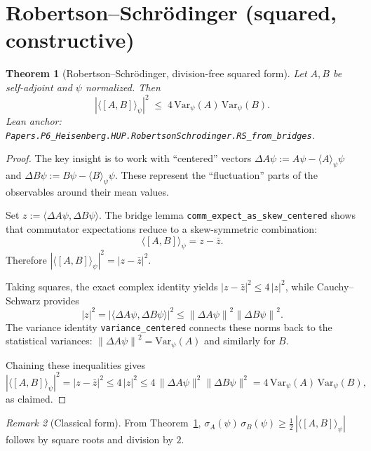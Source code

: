\documentclass[11pt]{article}
\newcommand{\lean}[1]{\texttt{#1}}
\newcommand{\leanok}{\text{\tiny [✓ Lean Verified]}}
\newcommand{\ip}[2]{\langle #1, #2 \rangle}
\newcommand{\E}[1]{\langle #1 \rangle}
\newcommand{\comm}[2]{[#1, #2]}
\newcommand{\stddev}{\sigma}
\newcommand{\absC}[1]{\left| #1 \right|}
\newcommand{\abssq}[1]{\absC{#1}^{2}}
\newcommand{\norm}[1]{\left\lVert #1 \right\rVert}
\newcommand{\Var}{\mathrm{Var}}
\theoremstyle{plain}
\newtheorem{theorem}{Theorem}[section]
\theoremstyle{definition}
\theoremstyle{remark}
\newtheorem{remark}[theorem]{Remark}
\begin{document}
\section{Robertson--Schrödinger (squared, constructive)}
\label{sec:RS}

\begin{theorem}[Robertson--Schrödinger, division-free squared form]\leanok
\label{thm:RS-squared}
Let $A,B$ be self-adjoint and $\psi$ normalized. Then
\[
  \abssq{\E{\comm{A}{B}}_\psi} \;\le\; 4\,\Var_\psi(A)\,\Var_\psi(B).
\]
\emph{Lean anchor:} \lean{Papers.P6\_Heisenberg.HUP.RobertsonSchrodinger.RS\_from\_bridges}.
\end{theorem}

\begin{proof}
The key insight is to work with ``centered'' vectors $\Delta A\psi := A\psi - \langle A \rangle_\psi \psi$ and $\Delta B\psi := B\psi - \langle B \rangle_\psi \psi$. These represent the ``fluctuation'' parts of the observables around their mean values.

Set $z := \ip{\Delta A\psi}{\Delta B\psi}$. The bridge lemma \lean{comm\_expect\_as\_skew\_centered} shows that commutator expectations reduce to a skew-symmetric combination:
\[
\E{\comm{A}{B}}_\psi = z - \bar{z}.
\]
Therefore $\abssq{\E{\comm{A}{B}}_\psi} = \abssq{z - \bar{z}}$.

Taking squares, the exact complex identity yields $\abssq{z - \bar{z}} \le 4\,\abssq{z}$, while Cauchy--Schwarz provides
\[
\abssq{z} = \abssq{\ip{\Delta A\psi}{\Delta B\psi}} \leq \norm{\Delta A\psi}^2 \norm{\Delta B\psi}^2.
\]
The variance identity \lean{variance\_centered} connects these norms back to the statistical variances: $\norm{\Delta A\psi}^2 = \Var_\psi(A)$ and similarly for $B$.

Chaining these inequalities gives
\(
\abssq{\E{\comm{A}{B}}_\psi}
=\abssq{z-\bar z}
\le 4\,\abssq{z}
\le 4\,\|\Delta A\psi\|^2 \|\Delta B\psi\|^2
=4\,\Var_\psi(A)\,\Var_\psi(B),
\)
as claimed.
\end{proof}

\begin{remark}[Classical form]
From Theorem~\ref{thm:RS-squared},
$\stddev_A(\psi)\,\stddev_B(\psi)\ge \tfrac12\,\absC{\E{\comm{A}{B}}_\psi}$ follows by square roots and division by $2$.
\end{remark}

\end{document}
